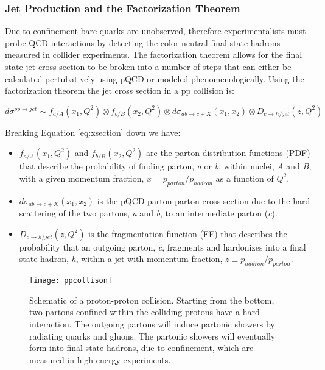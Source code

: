 \subsubsection{Jet Production and the Factorization Theorem}\label{sec:fac}

Due to confinement bare quarks are unobserved, therefore experimentalists must probe QCD interactions by detecting the color neutral final state hadrons measured in collider experiments.  The factorization theorem allows for the final state jet cross section to be broken into a number of steps that can either be calculated pertubatively using pQCD or modeled phenomenologically.  Using the factorization theorem the jet cross section in a pp collision is:


\begin{equation}
d\sigma^{pp \rightarrow jet} \sim f_{a/A}(x_{1},Q^{2}) \otimes  f_{b/B}(x_{2},Q^{2}) \otimes d\sigma_{ab \rightarrow c + X} (x_{1},x_{2}) \otimes D_{c \rightarrow h/jet}(z,Q^{2})
\label{eq:xsection}
\end{equation}

\noindent
Breaking Equation \ref{eq:xsection} down we have:

\begin{itemize}
\item  $ f_{a/A}(x_{1},Q^{2})$ and $ f_{b/B}(x_{2},Q^{2})$ are the parton distribution functions (PDF) that describe the probability of finding parton, \textit{a} or \textit{b}, within nuclei, \textit{A} and \textit{B}, with a given momentum fraction, $x = p_{parton} / p_{hadron} $ as a function of $Q^{2}$.
\item  $d\sigma_{ab \rightarrow c + X} (x_{1},x_{2})$ is the pQCD parton-parton cross section due to the hard scattering of the two partons, \textit{a} and \textit{b}, to an intermediate parton (\textit{c}).
\item   $ D_{c \rightarrow h/jet}(z,Q^{2})$ is the fragmentation function (FF) that describes the probability that an outgoing parton, \textit{c}, fragments and hardonizes into a final state hadron, \textit{h}, within a jet with momentum fraction, $z \equiv p_{hadron} / p_{parton}$.
\end{itemize}

\begin{figure}[h]
\texttt{[image: ppcollison]}
\centering
\caption{Schematic of a proton-proton collision.  Starting from the bottom, two partons confined within the colliding protons have a hard interaction.  The outgoing partons will induce partonic showers by radiating quarks and gluons.  The partonic showers will eventually form into final state hadrons, due to confinement, which are measured in high energy experiments\cite{Dobbs:2001ck}.}
\label{fig:FactorizationCartoon}
\end{figure}

